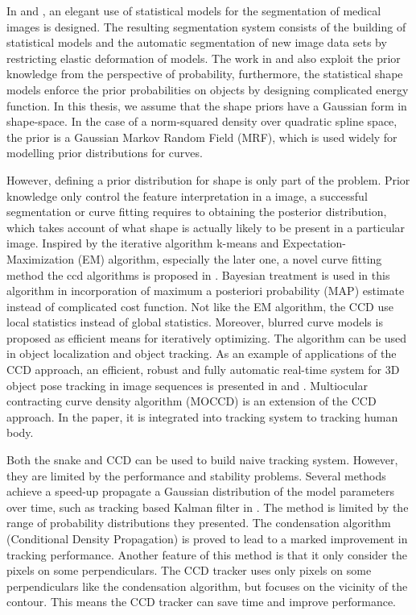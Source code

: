 In \cite{kelemen1999three} and \cite{kelemen1999elastic}, an elegant
use of statistical models for the segmentation of medical images is
designed.  The resulting segmentation system consists of the building
of statistical models and the automatic segmentation of new image data
sets by restricting elastic deformation of models.  The work in
\cite{sclaroff2001deformable} and \cite{liu1999deformable} also
exploit the prior knowledge from the perspective of probability,
furthermore, the statistical shape models enforce the prior
probabilities on objects by designing complicated energy function.  In this thesis, we assume that the shape priors have a Gaussian form in
shape-space. In the case of a norm-squared density over  quadratic spline space,
the prior is a Gaussian Markov Random Field
(MRF)\cite{blake1998active}, which is used widely  for modelling prior
distributions for curves\cite{storvik1994bayesian}.


However, defining a prior distribution for shape is only part of the
problem. Prior knowledge only control the feature interpretation in a
image, a successful segmentation or curve fitting requires to
obtaining the posterior distribution, which takes account of what
shape is actually likely to be present in a particular image. Inspired
by the iterative algorithm k-means\cite{ding2004k} and
Expectation-Maximization (EM)\cite{dempster1977maximum} algorithm, especially the later one, a novel
curve fitting method the ccd algorithms is proposed in
\cite{hanek2004contracting}. Bayesian treatment is used in this
algorithm in incorporation of maximum a posteriori probability (MAP)
\cite{sorenson1980parameter} estimate instead of complicated cost
function. Not like the EM algorithm, the CCD use local statistics
instead of global statistics. Moreover, blurred curve models is
proposed as efficient means for iteratively optimizing. The algorithm
can be used in object localization and object tracking. As an example
of applications of the CCD approach, an efficient, robust and fully
automatic real-time system for 3D object pose tracking in
image sequences is presented in \cite{panin2006fully} and
\cite{panin2006efficient}. Multiocular contracting curve density
algorithm (MOCCD) \cite{hahn2007tracking} is an extension of the CCD
approach. In the paper, it is integrated into tracking system to
tracking human body. 

Both the snake and CCD can be used to build naive tracking
system. However, they are limited by the performance and stability
problems. Several methods achieve a speed-up propagate a Gaussian
distribution of the model parameters over time, such as tracking based
Kalman filter in \cite{brookner1998tracking}. The method is limited by the range of probability
distributions they presented. The condensation algorithm (Conditional
Density Propagation) \cite{isard1998icondensation} is proved to lead
to a marked improvement in tracking performance. Another feature of
this method is that it only consider the pixels on some
perpendiculars. The CCD tracker \cite{hanek2004fitting} uses only
pixels on some perpendiculars like the condensation algorithm, but
focuses on the vicinity of the contour. This means the CCD tracker can
save time and improve performance.

